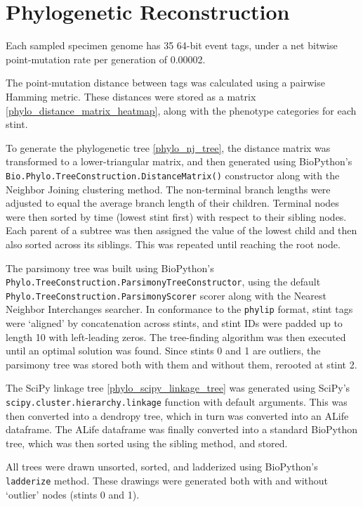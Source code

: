 \section{Phylogenetic Reconstruction}

Each sampled specimen genome has 35 64-bit event tags, under a net bitwise point-mutation rate per generation of 0.00002.

The point-mutation distance between tags was calculated using a pairwise Hamming metric.
These distances were stored as a matrix \ref{phylo_distance_matrix_heatmap}, along with the phenotype categories for each stint.

To generate the phylogenetic tree \ref{phylo_nj_tree}, the distance matrix was transformed to a lower-triangular matrix, and then generated using BioPython's \texttt{Bio.Phylo.TreeConstruction.DistanceMatrix()} constructor along with the Neighbor Joining clustering method.
The non-terminal branch lengths were adjusted to equal the average branch length of their children.
Terminal nodes were then sorted by time (lowest stint first) with respect to their sibling nodes.
Each parent of a subtree was then assigned the value of the lowest child and then also sorted across its siblings.
This was repeated until reaching the root node.

The parsimony tree was built using BioPython's \texttt{Phylo.TreeConstruction.ParsimonyTreeConstructor}, using the default \texttt{Phylo.TreeConstruction.ParsimonyScorer} scorer along with the Nearest Neighbor Interchanges searcher.
In conformance to the \texttt{phylip} format, stint tags were `aligned' by concatenation across stints, and stint IDs were padded up to length 10 with left-leading zeros.
The tree-finding algorithm was then executed until an optimal solution was found.
Since stints 0 and 1 are outliers, the parsimony tree was stored both with them and without them, rerooted at stint 2.

The SciPy linkage tree \ref{phylo_scipy_linkage_tree} was generated using SciPy's \texttt{scipy.cluster.hierarchy.linkage} function with default arguments.
This was then converted into a dendropy tree, which in turn was converted into an ALife dataframe.
The ALife dataframe was finally converted into a standard BioPython tree, which was then sorted using the sibling method, and stored.

All trees were drawn unsorted, sorted, and ladderized using BioPython's \texttt{ladderize} method.
These drawings were generated both with and without `outlier' nodes (stints 0 and 1).



